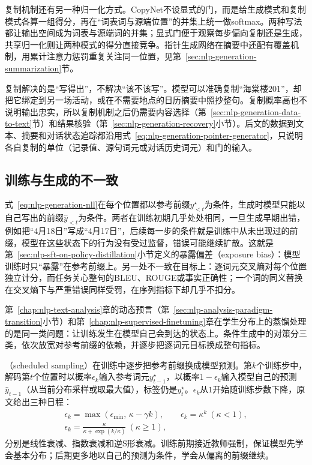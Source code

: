复制机制还有另一种归一化方式。CopyNet不设显式的门，而是给生成模式和复制模式各算一组得分，再在“词表词与源端位置”的并集上统一做softmax。两种写法都让输出空间成为词表与源端词的并集；显式门便于观察每步偏向复制还是生成，共享归一化则让两种模式的得分直接竞争。指针生成网络在摘要中还配有覆盖机制，用累计注意力惩罚重复关注同一位置，见第~\ref{sec:nlp-generation-summarization}节。

复制解决的是“写得出”，不解决“该不该写”。模型可以准确复制“海棠楼201”，却把它绑定到另一场活动，或在不需要地点的日历摘要中照抄整句。复制概率高也不说明输出忠实，所以复制机制之后仍需要内容选择（第~\ref{sec:nlp-generation-data-to-text}节）和结果核验（第~\ref{sec:nlp-generation-recovery}小节）。后文的数据到文本、摘要和对话状态追踪都沿用式~\eqref{eq:nlp-generation-pointer-generator}，只说明各自复制的单位（记录值、源句词元或对话历史词元）和门的输入。

\subsection{训练与生成的不一致}
\label{sec:nlp-generation-exposure-bias}

式~\eqref{eq:nlp-generation-nll}在每个位置都以参考前缀$y^{\star}_{<t}$为条件，生成时模型只能以自己写出的前缀$\hat y_{<t}$为条件。两者在训练初期几乎处处相同，一旦生成早期出错，例如把“4月18日”写成“4月17日”，后续每一步的条件就是训练中从未出现过的前缀，模型在这些状态下的行为没有受过监督，错误可能继续扩散。这就是第~\ref{sec:nlp-sft-on-policy-distillation}小节定义的暴露偏差（exposure bias）：模型训练时只“暴露”在参考前缀上。另一处不一致在目标上：逐词元交叉熵对每个位置独立计分，而任务关心整句的BLEU、ROUGE或事实正确性；一个词的同义替换在交叉熵下与严重错误同样受罚，在序列指标下却几乎不扣分。

第~\ref{chap:nlp-text-analysis}章的动态预言（第~\ref{sec:nlp-analysis-paradigm-transition}小节）和第~\ref{chap:nlp-supervised-finetuning}章在学生分布上的蒸馏处理的是同一类问题：让训练发生在模型自己会到达的状态上。条件生成中的对策分三类，依次放宽对参考前缀的依赖，并逐步把逐词元目标换成整句指标。

（scheduled sampling）在训练中逐步把参考前缀换成模型预测。第$k$个训练步中，解码第$t$个位置时以概率$\epsilon_k$输入参考词元$y^{\star}_{t-1}$，以概率$1-\epsilon_k$输入模型自己的预测$\hat y_{t-1}$（从当前分布采样或取最大值），标签仍是$y^{\star}_t$。$\epsilon_k$从$1$开始随训练步数下降，原文给出三种日程：
\begin{equation}
  \begin{gathered}
  \epsilon_k=\max(\epsilon_{\min},\,\kappa-\gamma k),\qquad
  \epsilon_k=\kappa^{k}\ (\kappa<1),\\
  \epsilon_k=\frac{\kappa}{\kappa+\exp(k/\kappa)}\ (\kappa\geq1),
  \end{gathered}
  \label{eq:nlp-generation-scheduled-sampling}
\end{equation}
分别是线性衰减、指数衰减和逆S形衰减。训练前期接近教师强制，保证模型先学会基本分布；后期更多地以自己的预测为条件，学会从偏离的前缀继续。

